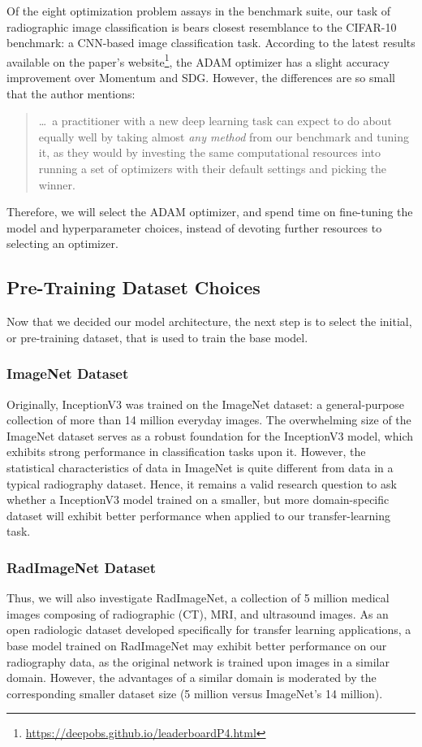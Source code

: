 Of the eight optimization problem assays in the benchmark suite, our task of radiographic image classification is bears closest resemblance to the CIFAR-10 benchmark: a CNN-based image classification task. According to the latest results available on the paper's website\footnote{\url{https://deepobs.github.io/leaderboardP4.html}}, the ADAM optimizer has a slight accuracy improvement over Momentum and SDG. However, the differences are so small that the author mentions: 

\blockcquote[2]{crowdedvalley}{
    \ldots\ a practitioner with a new deep learning task can expect to do about equally well by taking almost \emph{any method} from our benchmark and tuning it, as they would by investing the same computational resources into running a set of optimizers with their default settings and picking the winner.
}

\noindent
Therefore, we will select the ADAM optimizer, and spend time on fine-tuning the model and hyperparameter choices, instead of devoting further resources to selecting an optimizer.

\subsection{Pre-Training Dataset Choices}

Now that we decided our model architecture, the next step is to select the initial, or pre-training dataset, that is used to train the base model.

\subsubsection{ImageNet Dataset}
Originally, InceptionV3 was trained on the ImageNet dataset: a general-purpose collection of more than 14 million everyday images. \autocite{imagenet} The overwhelming size of the ImageNet dataset serves as a robust foundation for the InceptionV3 model, which exhibits strong performance in classification tasks upon it. However, the statistical characteristics of data in ImageNet is quite different from data in a typical radiography dataset. Hence, it remains a valid research question to ask whether a InceptionV3 model trained on a smaller, but more domain-specific dataset will exhibit better performance when applied to our transfer-learning task.

\subsubsection{RadImageNet Dataset}
Thus, we will also investigate RadImageNet, a collection of 5 million medical images composing of radiographic (CT), MRI, and ultrasound images. \autocite{radimagenet} As an open radiologic dataset developed specifically for transfer learning applications, a base model trained on RadImageNet may exhibit better performance on our radiography data, as the original network is trained upon images in a similar domain. However, the advantages of a similar domain is moderated by the corresponding smaller dataset size (5 million versus ImageNet's 14 million).

